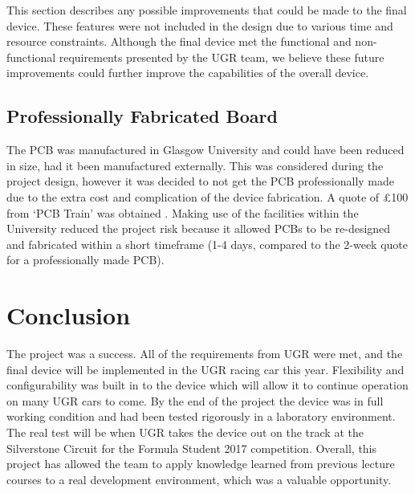 \documentclass[a4paper,12pt]{article}
\begin{document}
This section describes any possible improvements that could be made to the final device. These features were not included in the design due to various time and resource constraints. Although the final device met the functional and non-functional requirements presented by the UGR team, we believe these future improvements could further improve the capabilities of the overall device.

\subsection{Professionally Fabricated Board}
\label{sec:future_improvement_1}

The PCB was manufactured in Glasgow University and could have been reduced in size, had it been manufactured externally. This was considered during the project design, however it was decided to not get the PCB professionally made due to the extra cost and complication of the device fabrication. A quote of £100 from ‘PCB Train’ was obtained \cite{pcb_train}. Making use of the facilities within the University reduced the project risk because it allowed PCBs to be re-designed and fabricated within a short timeframe (1-4 days, compared to the 2-week quote for a professionally made PCB).


\section{Conclusion}
\label{sec:conclusion}

The project was a success. All of the requirements from UGR were met, and the final device will be implemented in the UGR racing car this year. Flexibility and configurability was built in to the device which will allow it to continue operation on many UGR cars to come. By the end of the project the device was in full working condition and had been tested rigorously in a laboratory environment. The real test will be when UGR takes the device out on the track at the Silverstone Circuit for the Formula Student 2017 competition. Overall, this project has allowed the team to apply knowledge learned from previous lecture courses to a real development environment, which was a valuable opportunity.

\end{document}
